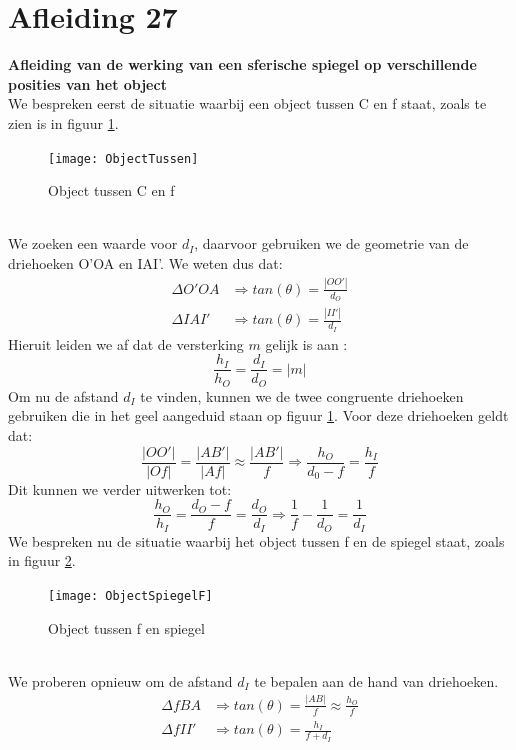 \documentclass[a4paper,kul]{kulakarticle} %
\begin{document}
\section{Afleiding 27}
\textbf{Afleiding van de werking van een sferische spiegel op verschillende posities van het object}\\
We bespreken eerst de situatie waarbij een object tussen C en f staat, zoals te zien is in figuur \ref{fig:objecttussen}.
\begin{figure}[h]
	\centering
	\texttt{[image: ObjectTussen]}
	\caption[Object tussen C en f]{Object tussen C en f}
	\label{fig:objecttussen}
\end{figure}\\
We zoeken een waarde voor $d_I$, daarvoor gebruiken we de geometrie van de driehoeken O'OA en IAI'.  We weten dus dat: 
\begin{align*}
	\Delta O'OA&\Rightarrow tan(\theta) = \frac{|OO'|}{d_O}\\
	\Delta IAI'&\Rightarrow tan(\theta) = \frac{|II'|}{d_I}
\end{align*}
Hieruit leiden we af dat de versterking $m$ gelijk is aan :
\begin{equation*}
	\frac{h_I}{h_O} = \frac{d_I}{d_O} = |m|
\end{equation*}
Om nu de afstand $d_I$ te vinden, kunnen we de twee congruente driehoeken gebruiken die in het geel aangeduid staan op figuur \ref{fig:objecttussen}. Voor deze driehoeken geldt dat: 
\begin{equation*}
	\frac{|OO'|}{|Of|}=\frac{|AB'|}{|Af|} \approx\frac{|AB'|}{f} \Rightarrow \frac{h_O}{d_0-f} = \frac{h_I}{f}
\end{equation*}
Dit kunnen we verder uitwerken tot:
\begin{equation*}
	\frac{h_O}{h_I} = \frac{d_O-f}{f}=\frac{d_O}{d_I}\Rightarrow\frac{1}{f}-\frac{1}{d_O} = \frac{1}{d_I}
\end{equation*}
\newpage
We bespreken nu de situatie waarbij het object tussen f en de spiegel staat, zoals in figuur \ref{fig:objectspiegelf}.
\begin{figure}[h]
	\centering
	\texttt{[image: ObjectSpiegelF]}
	\caption[Object tussen f en spiegel]{Object tussen f en spiegel}
	\label{fig:objectspiegelf}
\end{figure}\\
We proberen opnieuw om de afstand $d_I$ te bepalen aan de hand van driehoeken.
\begin{align*}
	\Delta fBA&\Rightarrow tan(\theta)=\frac{|AB|}{f}\approx\frac{h_O}{f}\\
	\Delta fII'&\Rightarrow tan(\theta)= \frac{h_I}{f+d_I}
\end{align*}
\end{document}
